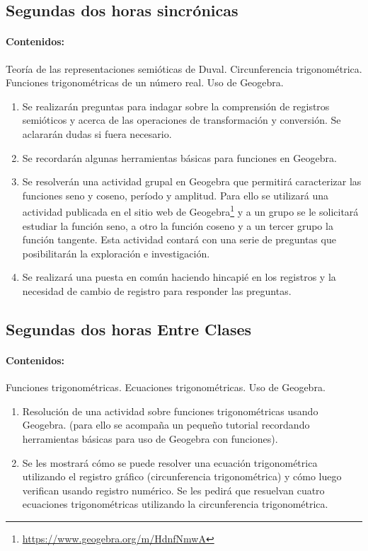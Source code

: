 \documentclass[oneside,spanish]{amsart}
\numberwithin{equation}{section}
\numberwithin{figure}{section}
\begin{document}
\break

\subsection{Segundas dos horas sincrónicas}\label{subsec:segundas-dos}

\paragraph{Contenidos:}

Teoría de las representaciones semióticas de Duval. Circunferencia trigonométrica. Funciones trigonométricas de un número real. Uso de Geogebra.

\begin{enumerate}[1.]
	\item Se realizarán preguntas para indagar sobre la comprensión de registros semióticos y acerca de las operaciones de transformación y conversión. Se aclararán dudas si fuera necesario.
	\item Se recordarán algunas herramientas básicas para funciones en Geogebra.
	\item Se resolverán una actividad  grupal  en Geogebra que permitirá caracterizar las funciones seno y coseno, período y amplitud. Para ello se utilizará una actividad publicada en el sitio web de Geogebra\footnote{\url{https://www.geogebra.org/m/HdnfNmwA}} y a un grupo se le solicitará estudiar la función seno, a otro la función coseno y a un tercer grupo la función tangente. Esta actividad contará con una serie de preguntas que posibilitarán la exploración e investigación.
	\item Se realizará una puesta en común haciendo hincapié en los registros y la necesidad de cambio de registro para responder las preguntas.
\end{enumerate}

\subsection{Segundas dos horas Entre Clases}\label{subsec:segundas-dos-EC}

\paragraph{Contenidos:}

Funciones trigonométricas. Ecuaciones trigonométricas. Uso de Geogebra.

\begin{enumerate}[1.]
	\item Resolución de una actividad sobre funciones trigonométricas usando Geogebra. (para ello se acompaña un pequeño tutorial recordando herramientas básicas para uso de Geogebra con funciones).
	\item Se les mostrará cómo se puede resolver una ecuación trigonométrica utilizando el registro gráfico (circunferencia trigonométrica) y cómo luego verifican usando registro numérico. Se les pedirá que resuelvan cuatro ecuaciones trigonométricas utilizando la circunferencia trigonométrica.
\end{enumerate}
\end{document}
